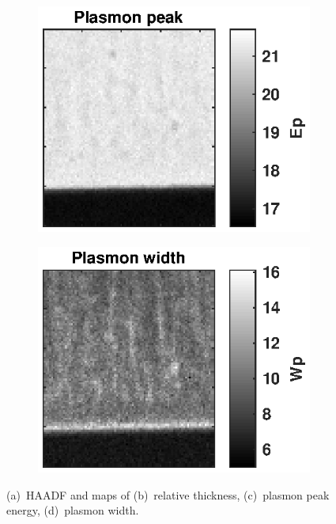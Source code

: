 \documentclass[%
 aip,
rsi,%
 amsmath,amssymb,
 reprint,%
]{revtex4-1}
\begin{document}
\begin{figure}
    \begin{subfigure}{0.3\textwidth}
		\includegraphics[width=\textwidth]{Ep_map_SI1}
		\subcaption{}
		\label{fig:Ep_map}
	\end{subfigure}
    \begin{subfigure}{0.3\textwidth}
		\includegraphics[width=\textwidth]{Wp_map_SI1}
		\subcaption{}
		\label{fig:Wp_map}
	\end{subfigure}
    \caption{(a)~HAADF and maps of (b)~relative thickness, (c)~plasmon peak energy, (d)~plasmon width.}
\end{figure}
\end{document}
